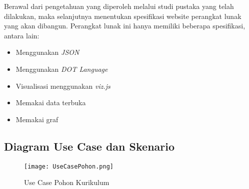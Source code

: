 Berawal dari pengetahuan yang diperoleh melalui studi pustaka yang telah dilakukan, maka selanjutnya
menentukan spesifikasi website perangkat lunak yang akan dibangun. Perangkat lunak ini hanya
memiliki beberapa spesifikasi, antara lain:
\begin{itemize}
\item Menggunakan \textit{JSON} 
\item Menggunakan \textit{DOT Language}
\item Visualisasi menggunakan \textit{viz.js}
\item Memakai data terbuka
\item Memakai graf
\end{itemize}

\subsection{Diagram Use Case dan Skenario}
\label{sec: Diagram Use Case dan Skenario}

\begin{figure}[H]
		\centering
		\texttt{[image: UseCasePohon.png]}
		\caption{Use Case Pohon Kurikulum}
		\label{fig: Use Case Pohon Kurikulum}
\end{figure}	

